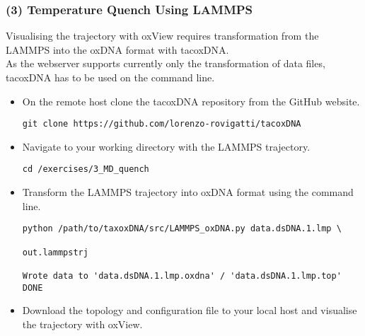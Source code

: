 \documentclass[slidestop,compress,9pt]{beamer}
\begin{document}
\begin{frame}[fragile]
\frametitle{(3) Temperature Quench Using LAMMPS}

Visualising the trajectory with oxView requires transformation from the LAMMPS into the oxDNA format with tacoxDNA.\\[5pt]
As the webserver supports currently only the transformation of data files, tacoxDNA has to be used on the command line.

\begin{itemize}

\item On the remote host clone the tacoxDNA repository from the GitHub website.
\begin{lstlisting}
git clone https://github.com/lorenzo-rovigatti/tacoxDNA
\end{lstlisting}
\item Navigate to your working directory with the LAMMPS trajectory.
\begin{lstlisting}
cd /exercises/3_MD_quench
\end{lstlisting}
\item Transform the LAMMPS trajectory into oxDNA format using the command line. 
\begin{lstlisting}
python /path/to/taxoxDNA/src/LAMMPS_oxDNA.py data.dsDNA.1.lmp \
                                                              out.lammpstrj

Wrote data to 'data.dsDNA.1.lmp.oxdna' / 'data.dsDNA.1.lmp.top'
DONE
\end{lstlisting}
\item Download the topology and configuration file to your local host and visualise the trajectory with oxView.

\end{itemize}


\end{frame}
\end{document}
